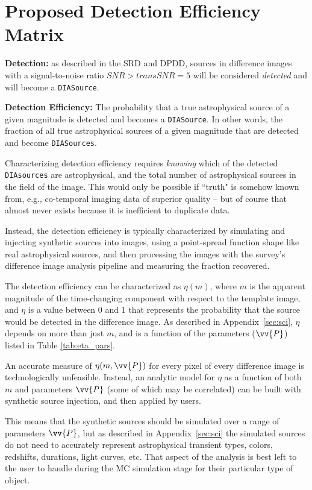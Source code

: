 \documentclass[DM,lsstdraft,toc]{lsstdoc}
\begin{document}
\section{Proposed Detection Efficiency Matrix}

{\bf Detection:} as described in the SRD and DPDD, sources in difference images with a signal-to-noise ratio $SNR > {transSNR} = 5$ will be considered {\it detected} and will become a {\tt DIASource}.
 
{\bf Detection Efficiency:} The probability that a true astrophysical source of a given magnitude is detected and becomes a {\tt DIASource}. In other words, the fraction of all true astrophysical sources of a given magnitude that are detected and become {\tt DIASources}. 

Characterizing detection efficiency requires {\it knowing} which of the detected {\tt DIAsources} are astrophysical, and the total number of astrophysical sources in the field of the image.
This would only be possible if ``truth" is somehow known from, e.g., co-temporal imaging data of superior quality -- but of course that almost never exists because it is inefficient to duplicate data.

Instead, the detection efficiency is typically characterized by simulating and injecting synthetic sources into images, using a point-spread function shape like real astrophysical sources, and then processing the images with the survey's difference image analysis pipeline and measuring the fraction recovered.

The detection efficiency can be characterized as $\eta(m)$, where $m$ is the apparent magnitude of the time-changing component with respect to the template image, and $\eta$ is a value between $0$ and $1$ that represents the probability that the source would be detected in the difference image.
As described in Appendix~\ref{sec:sci}, $\eta$ depends on more than just $m$, and is a function of the parameters ($\vv{P}$) listed in Table \ref{tab:eta_pars}.

An accurate measure of $\eta(m,\vv{P})$ for every pixel of every difference image is technologically unfeasible.
Instead, an analytic model for $\eta$ as a function of both $m$ and parameters $\vv{P}$ (some of which may be correlated) can be built with synthetic source injection, and then applied by users.

This means that the synthetic sources should be simulated over a range of parameters $\vv{P}$, but as described in Appendix~\ref{sec:sci} the simulated sources do not need to accurately represent astrophysical transient types, colors, redshifts, durations, light curves, etc.
That aspect of the analysis is best left to the user to handle during the MC simulation stage for their particular type of object.
 
\end{document}
